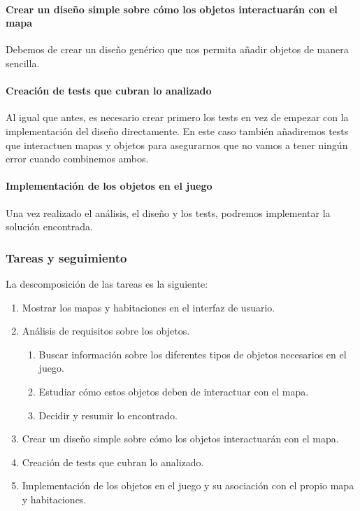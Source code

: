 \paragraph{Crear un diseño simple sobre cómo los objetos interactuarán con el mapa} Debemos de crear un diseño genérico que nos permita añadir objetos de manera sencilla.

\paragraph{Creación de tests que cubran lo analizado} Al igual que antes, es necesario crear primero los tests en vez de empezar con la implementación del diseño directamente. En este caso también añadiremos tests que interactuen mapas y objetos para asegurarnos que no vamos a tener ningún error cuando combinemos ambos.

\paragraph{Implementación de los objetos en el juego} Una vez realizado el análisis, el diseño y los tests, podremos implementar la solución encontrada.

\subsubsection{Tareas y seguimiento}

La descomposición de las tareas es la siguiente:

\begin{enumerate}[label=\bfseries WBS 1.\arabic*]
  \item Mostrar los mapas y habitaciones en el interfaz de usuario.
  \item Análisis de requisitos sobre los objetos.
    \begin{enumerate}[label=\bfseries WBS 1.1.\arabic*]
      \item Buscar información sobre los diferentes tipos de objetos necesarios en el juego.
      \item Estudiar cómo estos objetos deben de interactuar con el mapa.
      \item Decidir y resumir lo encontrado.
    \end{enumerate}
  \item Crear un diseño simple sobre cómo los objetos interactuarán con el mapa.
  \item Creación de tests que cubran lo analizado.
  \item Implementación de los objetos en el juego y su asociación con el propio mapa y habitaciones.
\end{enumerate}

